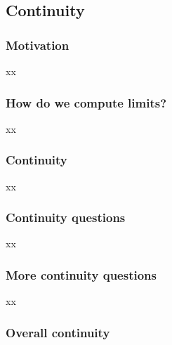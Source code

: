 \documentclass[pdftex, brazil, 12pt, twoside]{article}
\begin{document}
\subsection{Continuity}
\label{u0-cont}

\subsubsection{Motivation}
\label{u0-cont-motivation}

xx

\subsubsection{How do we compute limits?}
\label{u0-cont-how-compute}

xx

\subsubsection{Continuity}
\label{u0-cont-continuity}

xx

\subsubsection{Continuity questions}
\label{u0-cont-continuity-questions}

xx

\subsubsection{More continuity questions}
\label{u0-cont-more-continuity-questions}

xx

\subsubsection{Overall continuity}
\label{u0-cont-overall}
\end{document}
